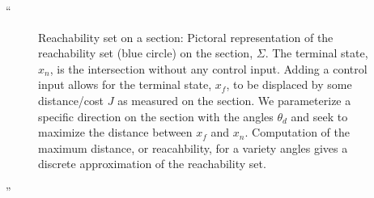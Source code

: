 \documentclass[11pt]{article}
\newenvironment{correction}{\begin{list}{}{\setlength{\leftmargin}{1cm}\setlength{\rightmargin}{1cm}}\vspace{\parsep}\item[]``}{''\end{list}}
\begin{document}
\begin{enumerate}
\begin{correction}
\begin{figure}[H]
\begin{scaletikzpicturetowidth}{0.5\textwidth}
        \end{scaletikzpicturetowidth}
        \caption{Reachability set on a \Poincare section: Pictoral representation of the reachability set (blue circle) on the \Poincare section, \(\Sigma\). 
            The terminal state, \( x_n\), is the intersection without any control input. 
            Adding a control input allows for the terminal state, \( x_f \), to be displaced by some distance/cost \( J \) as measured on the section.
            We parameterize a specific direction on the section with the angles \( \theta_d\) and seek to maximize the distance between \( x_f \) and \( x_n \).
            Computation of the maximum distance, or reacahbility, for a variety angles gives a discrete approximation of the reachability set.}
\end{figure}

\begin{figure}[H]
        \centering
        \begin{scaletikzpicturetowidth}{1\textwidth}
\end{scaletikzpicturetowidth}
\end{figure}
\end{correction}
\end{enumerate}
\end{document}
